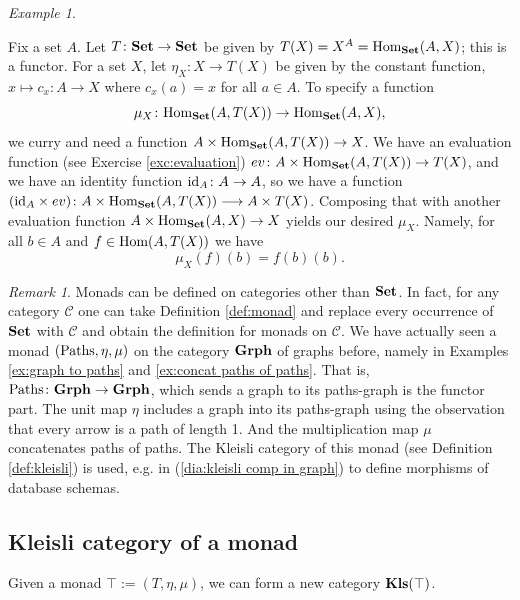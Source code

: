 \documentclass{book}
\def\tn{\textnormal}
\def\mc{\mathcal}
\def\Hom{\tn{Hom}}
\def\Paths{\tn{Paths}}
\def\to{\rightarrow}
\def\taking{\colon}
\def\too{\longrightarrow}
\def\id{\tn{id}}
\def\Grph{{\bf Grph}}
\def\Kls{{\bf Kls}}
\def\Set{{\bf Set}}
\def\mcC{\mc{C}}
\theoremstyle{remark}
\newtheorem{remark}[subsubsection]{Remark}
\newtheorem{example}[subsubsection]{Example}
\theoremstyle{definition}
\begin{document}
\begin{example}\label{ex:experimenter matters 2}

Fix a set $A$. Let $T\taking\Set\to\Set$ be given by $T(X)=X^A=\Hom_\Set(A,X)$; this is a functor. For a set $X$, let $\eta_X\taking X\to T(X)$ be given by the constant function, $x\mapsto c_x\taking A\to X$ where $c_x(a)=x$ for all $a\in A$. To specify a function
$$\mu_X\taking\Hom_\Set(A,T(X))\to\Hom_\Set(A,X),$$ we curry and need a function $A\times\Hom_\Set(A,T(X))\to X$. We have an evaluation function (see Exercise \ref{exc:evaluation}) $ev\taking A\times\Hom_\Set(A,T(X))\to T(X)$, and we have an identity function $\id_A\taking A\to A$, so we have a function $(\id_A\times ev)\taking A\times\Hom_\Set(A,T(X))\too A\times T(X)$. Composing that with another evaluation function $A\times\Hom_\Set(A,X)\to X$ yields our desired $\mu_X$. Namely, for all $b\in A$ and $f\in\Hom(A,T(X))$ we have
$$\mu_X(f)(b)=f(b)(b).$$

\end{example}

\begin{remark}\index{monad!on $\Grph$}\index{a monad!$\Paths$}

Monads can be defined on categories other than $\Set$. In fact, for any category $\mcC$ one can take Definition \ref{def:monad} and replace every occurrence of $\Set$ with $\mcC$ and obtain the definition for monads on $\mcC$. We have actually seen a monad $(\Paths,\eta,\mu)$ on the category $\Grph$ of graphs before, namely in Examples \ref{ex:graph to paths} and \ref{ex:concat paths of paths}. That is, $\Paths\taking\Grph\to\Grph$, which sends a graph to its paths-graph is the functor part. The unit map $\eta$ includes a graph into its paths-graph using the observation that every arrow is a path of length 1. And the multiplication map $\mu$ concatenates paths of paths. The Kleisli category of this monad (see Definition \ref{def:kleisli}) is used, e.g. in (\ref{dia:kleisli comp in graph}) to define morphisms of database schemas.

\end{remark}


\subsection{Kleisli category of a monad}\label{sec:kleisli}

Given a monad $\top:=(T,\eta,\mu)$, we can form a new category $\Kls(\top)$.
\end{document}
